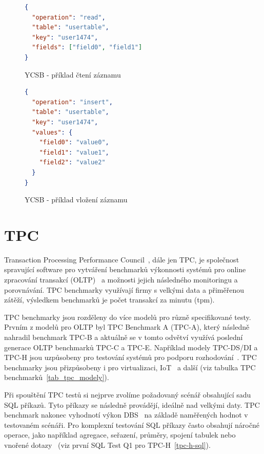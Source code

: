 \documentclass[czech,master,dept460,male,csharp,cpdeclaration]{diploma}
\begin{document}
	\begin{figure}[H]
	\centering
	\begin{lstlisting}[language=json,firstnumber=1]
{
  "operation": "read",
  "table": "usertable",
  "key": "user1474",
  "fields": ["field0", "field1"]
}
	\end{lstlisting}
	\caption{YCSB - příklad čtení záznamu}
	\label{json-ycsb-operace-read}
	\end{figure}	
	
	\begin{figure}[H]
		\centering
		\begin{lstlisting}[language=json,firstnumber=1]
{
  "operation": "insert",
  "table": "usertable",
  "key": "user1474",
  "values": {
    "field0": "value0",
    "field1": "value1",
    "field2": "value2"
  }
}
		\end{lstlisting}
		\caption{YCSB - příklad vložení záznamu}
		\label{json-ycsb-operace-insert}
	\end{figure}	
	
	
	\section{TPC}
	
	Transaction Processing Performance Council~\cite{tpc}, dále jen TPC, je společnost spravující software pro vytváření benchmarků výkonnosti systémů pro online zpracování transakcí (OLTP)~\cite{oltp} a možnosti jejich následného monitoringu a porovnávání. TPC benchmarky využívají firmy s velkými data a přiměřenou zátěží, výsledkem benchmarků je počet transakcí za minutu (tpm).
	
	TPC benchmarky jsou rozděleny do více modelů pro různě specifikované testy. Prvním z modelů pro OLTP byl TPC Benchmark A (TPC-A), který následně nahradil benchmark TPC-B a aktuálně se v tomto odvětví využívá poslední generace OLTP benchmarků TPC-C a TPC-E. Například modely TPC-DS/DI a TPC-H jsou uzpůsobeny pro testování systémů pro podporu rozhodování~\cite{dss}. TPC benchmarky jsou přizpůsobeny i pro virtualizaci, IoT~\cite{iot} a další (viz tabulka TPC benchmarků~\ref{tab_tpc_modely}).
	
	Při spouštění TPC testů si nejprve zvolíme požadovaný scénář obsahující sadu SQL příkazů. Tyto příkazy se následně provádějí, ideálně nad velkými daty. TPC benchmark nakonec vyhodnotí výkon DBS~\cite{tpc-ytb-benchmark} na základě naměřených hodnot v testovaném scénáři. Pro komplexní testování SQL příkazy často obsahují náročné operace, jako například agregace, seřazení, průměry, spojení tabulek nebo vnořené dotazy~\cite{tpc-h-sql, tpc-h-index} (viz první SQL Test Q1 pro TPC-H~\ref{tpc-h-sql}).
	
\end{document}
